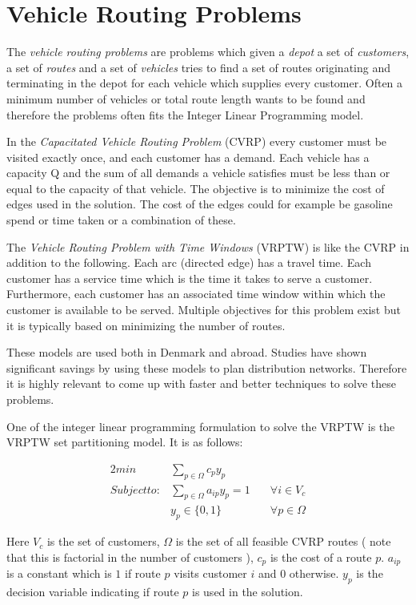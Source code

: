 \section{Vehicle Routing Problems}
The \textit{vehicle routing problems} are problems which given a \textit{depot} a set of \textit{customers}, a set of \textit{routes} and a set of \textit{vehicles} tries to find a set of routes originating and terminating in the depot for each vehicle which supplies every customer. Often a minimum number of vehicles or total route length wants to be found and therefore the problems often fits the Integer Linear Programming model. 

In the \textit{Capacitated Vehicle Routing Problem} (CVRP) every customer must be visited exactly once, and each customer has a demand. Each vehicle has a capacity Q and the sum of all demands a vehicle satisfies must be less than or equal to the capacity of that vehicle. The objective is to minimize the cost of edges used in the solution. The cost of the edges could for example be gasoline spend or time taken or a combination of these. 

The \textit{Vehicle Routing Problem with Time Windows} (VRPTW) is like the CVRP in addition to the following. Each arc (directed edge) has a travel time. Each customer has a service time which is the time it takes to serve a customer. Furthermore, each customer has an associated time window within which the customer is available to be served. Multiple objectives for this problem exist but it is typically based on minimizing the number of routes.

These models are used both in Denmark and abroad. Studies have shown significant savings by using these models to plan distribution networks. Therefore it is highly relevant to come up with faster and better techniques to solve these problems.

One of the integer linear programming formulation to solve the VRPTW is the VRPTW set partitioning model. It is as follows:

\begin{alignat}{2}
min         & \sum_{p\in \Omega} c_p y_p \\
Subject to: & \sum_{p \in \Omega} a_{ip} y_p = 1 \quad  & \forall i \in V_c \\
            & y_p \in \{0,1\}                           & \forall p \in \Omega
\end{alignat}

Here $V_c$ is the set of customers, $\Omega$ is the set of all feasible CVRP routes ( note that this is factorial in the number of customers ), $c_p$ is the cost of a route $p$. $a_{ip}$ is a constant which is $1$ if route $p$ visits customer $i$ and $0$ otherwise. $y_p$ is the decision variable indicating if route $p$ is used in the solution. 

